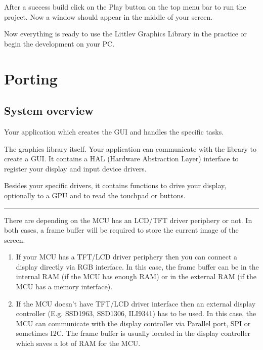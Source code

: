 \documentclass[letterpaper,10pt,english]{sphinxmanual}
\begin{document}
After a success build click on the Play button on the top menu bar to run the project. Now a window should appear in the middle of your screen.

Now everything is ready to use the Littlev Graphics Library in the practice or begin the development on your PC.


\chapter{Porting}
\label{\detokenize{porting/index:porting}}\label{\detokenize{porting/index::doc}}

\section{System overview}
\label{\detokenize{porting/sys:system-overview}}\label{\detokenize{porting/sys::doc}}

Your application which creates the GUI and handles the specific tasks.

The graphics library itself. Your application can communicate with the library to create a GUI. It contains a HAL (Hardware Abstraction Layer) interface to register your display and input device drivers.

Besides your specific drivers, it contains functions to drive your display, optionally to a GPU and to read the touchpad or buttons.


\bigskip\hrule\bigskip


There are  depending on the MCU has an LCD/TFT driver periphery or not. In both cases, a frame buffer will be required to store the current image of the screen.
\begin{enumerate}
\def\theenumi{\arabic{enumi}}
\def\labelenumi{\theenumi .}
\makeatletter\def\p@enumii{\p@enumi \theenumi .}\makeatother
\item {} 
If your MCU has a TFT/LCD driver periphery then you can connect a display directly via RGB interface.
In this case, the frame buffer can be in the internal RAM (if the MCU has enough RAM) or in the external RAM (if the MCU has a memory interface).

\item {} 
If the MCU doesn’t have TFT/LCD driver interface then an external display controller (E.g. SSD1963, SSD1306, ILI9341) has to be used.
In this case, the MCU can communicate with the display controller via Parallel port, SPI or sometimes I2C.
The frame buffer is usually located in the display controller which saves a lot of RAM for the MCU.

\end{enumerate}
\end{document}
